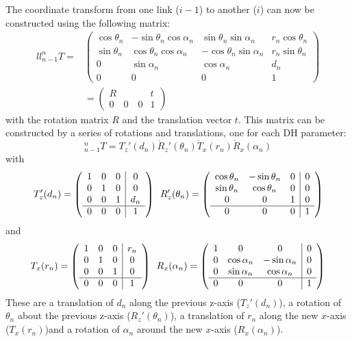 The coordinate transform from one link ($ i-1$) to another ($i$) can now be constructed  using the following matrix:
\begin{eqnarray}{ll}
\nonumber
_{n-1}^nT=&
\left(
\begin{array}{ccc|c}
\cos \theta_n & -\sin \theta_n \cos\alpha_n & \sin\theta_n \sin\alpha_n & r_n \cos\theta_n\\
\sin \theta_n & \cos\theta_n \cos\alpha_n & -\cos\theta_n\sin\alpha_n & r_n \sin\theta_n\\
0 & \sin\alpha_n & \cos\alpha_n & d_n\\
\hline
0 & 0 & 0 & 1
\end{array}
\right)\\
&=
\left(
\begin{array}{c|c}
R & t\\
\hline
0 \quad 0 \quad 0 & 1
\end{array}
\right)
\end{eqnarray}
with the rotation matrix $R$ and the translation vector $t$. This matrix can be constructed by a series of rotations and translations, one for each DH parameter:
\begin{equation}
_{n-1}^nT=T_z'(d_n)\dot R_z'(\theta_n) \dot T_x(r_n) \dot R_x(\alpha_n)
\end{equation}
with
\begin{equation}
T_z'(d_n)=
\left(
\begin{array}{ccc|c}
1 & 0 & 0 & 0\\
0 & 1 & 0 & 0\\
0 & 0 & 1 & d_n\\
\hline
0 & 0 & 0 & 1
\end{array}
\right)
\enskip
R_z'(\theta_n)=\left(
\begin{array}{ccc|c}
\cos\theta_n & -\sin\theta_n & 0 & 0\\
\sin\theta_n & \cos\theta_n & 0 & 0\\
0 & 0 & 1 & 0\\
\hline
0 & 0 & 0 & 1
\end{array}
\right)
\end{equation}
and
\begin{equation}
T_x(r_n)=
\left(
\begin{array}{ccc|c}
1 & 0 & 0 & r_n\\
0 & 1 & 0 & 0\\
0 & 0 & 1 & 0\\
\hline
0 & 0 & 0 & 1
\end{array}
\right)
\enskip
R_x(\alpha_n)=\left(
\begin{array}{ccc|c}
1 & 0 & 0 & 0\\
0 & \cos\alpha_n & -\sin\alpha_n & 0\\
0 & \sin\alpha_n & \cos\alpha_n & 0\\
\hline
0 & 0 & 0 & 1
\end{array}
\right)
\end{equation}
These are a translation of $d_n$ along the previous z-axis ($T_z'(d_n)$), a rotation of $\theta_n$ about the previous z-axis ($R_z'(\theta_n)$), a translation of $r_n$ along the new $x$-axis ($T_x(r_n)$)and a rotation of $\alpha_n$ around the new $x$-axis ($R_x(\alpha_n)$).

